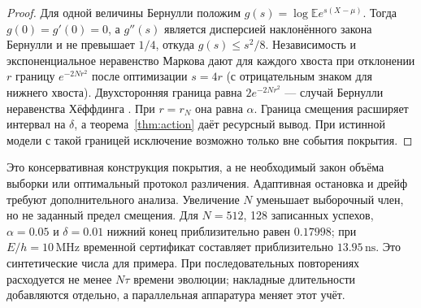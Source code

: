 \begin{proof}
{Для одной величины Бернулли положим $g(s)=\log\mathbb E e^{s(X-\mu)}$. Тогда $g(0)=g'(0)=0$, а $g''(s)$ является дисперсией наклонённого закона Бернулли и не превышает $1/4$, откуда $g(s)\leq s^2/8$. Независимость и экспоненциальное неравенство Маркова дают для каждого хвоста при отклонении $r$ границу $e^{-2Nr^2}$ после оптимизации $s=4r$ (с отрицательным знаком для нижнего хвоста). Двухсторонняя граница равна $2e^{-2Nr^2}$ --- случай Бернулли неравенства Хёффдинга \cite{Hoeffding}. При $r=r_N$ она равна $\alpha$. Граница смещения расширяет интервал на $\delta$, а теорема~\ref{thm:action} даёт ресурсный вывод. При истинной модели с такой границей исключение возможно только вне события покрытия.}
\end{proof}
{Это консервативная конструкция покрытия, а не необходимый закон объёма выборки или оптимальный протокол различения. Адаптивная остановка и дрейф требуют дополнительного анализа. Увеличение $N$ уменьшает выборочный член, но не заданный предел смещения. Для $N=512$, 128 записанных успехов, $\alpha=0.05$ и $\delta=0.01$ нижний конец приблизительно равен $0.17998$; при $E/h=10\,\mathrm{MHz}$ временной сертификат составляет приблизительно $13.95\,\mathrm{ns}$. Это синтетические числа для примера. При последовательных повторениях расходуется не менее $N\tau$ времени эволюции; накладные длительности добавляются отдельно, а параллельная аппаратура меняет этот учёт.}

